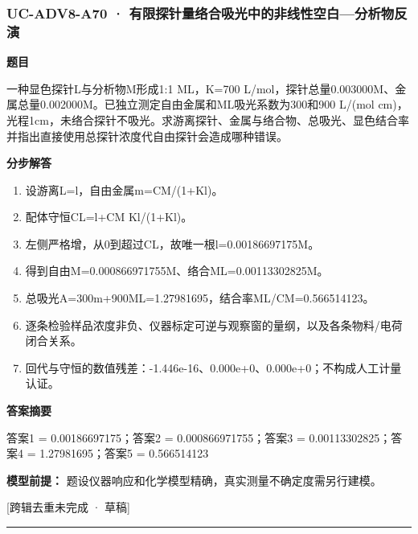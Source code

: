 \documentclass[UTF8,11pt,a4paper]{ctexart}
\begin{document}
\subsubsection*{UC-ADV8-A70 · 有限探针量络合吸光中的非线性空白—分析物反演}
\noindent\textbf{题目}\par
一种显色探针L与分析物M形成1:1 ML，K=700 L/mol，探针总量0.003000M、金属总量0.002000M。已独立测定自由金属和ML吸光系数为300和900 L/(mol cm)，光程1cm，未络合探针不吸光。求游离探针、金属与络合物、总吸光、显色结合率并指出直接使用总探针浓度代自由探针会造成哪种错误。\par
\medskip\noindent\textbf{分步解答}
\begin{enumerate}
\item 设游离L=l，自由金属m=CM/(1+Kl)。
\item 配体守恒CL=l+CM Kl/(1+Kl)。
\item 左侧严格增，从0到超过CL，故唯一根l=0.00186697175M。
\item 得到自由M=0.000866971755M、络合ML=0.00113302825M。
\item 总吸光A=300m+900ML=1.27981695，结合率ML/CM=0.566514123。
\item 逐条检验样品浓度非负、仪器标定可逆与观察窗的量纲，以及各条物料/电荷闭合关系。
\item 回代与守恒的数值残差：-1.446e-16、0.000e+0、0.000e+0；不构成人工计量认证。
\end{enumerate}
\noindent\textbf{答案摘要}\par
答案1 = 0.00186697175；答案2 = 0.000866971755；答案3 = 0.00113302825；答案4 = 1.27981695；答案5 = 0.566514123\par
\noindent\textbf{模型前提：}
题设仪器响应和化学模型精确，真实测量不确定度需另行建模。\par
\noindent\textcolor{red!65!black}{[跨辑去重未完成 · 草稿]} \par
\medskip\hrule\medskip
{}
\end{document}
